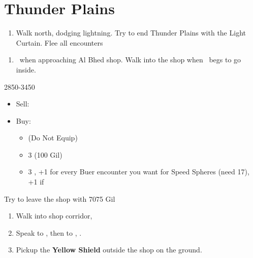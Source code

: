 \chapter{Thunder Plains}

\begin{enumerate}
	\item Walk north, dodging lightning. Try to end Thunder Plains with the Light Curtain. Flee all encounters
\end{enumerate}
\begin{enumerate}[resume]
	\item \sd\ when approaching Al Bhed shop. Walk into the shop when \rikku\ begs to go inside.
\end{enumerate}
\begin{shop}{2850-3450}
	\begin{itemize}
		\item Sell: \katana{}
		\item Buy:
		      \begin{itemize}
			      \item \shimmeringblade{} (Do Not Equip)
			      \item 3 \phoenixdown{} (100 Gil)
			      \item 3 \grenade{}, +1 for every Buer encounter you want for Speed Spheres (need 17), +1 if \blitzloss
		      \end{itemize}
	\end{itemize}
	Try to leave the shop with 7075 Gil
\end{shop}
\begin{enumerate}[resume]
	\item Walk into shop corridor, \cs[2:00]
	\item Speak to \auron, then to \rikku, \sd.
	\item Pickup the \textbf{Yellow Shield} outside the shop on the ground.
\end{enumerate}

